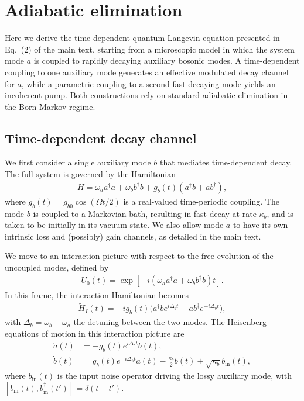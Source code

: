 \documentclass[prl,onecolumn,floatfix,10pt,superscriptaddress]{revtex4-2}
\begin{document}
\section{Adiabatic elimination}
Here we derive the time-dependent quantum Langevin equation presented in Eq.~(2) of the main text, starting from a microscopic model in which the system mode $a$ is coupled to rapidly decaying auxiliary bosonic modes. A time-dependent coupling to one auxiliary mode generates an effective modulated decay channel for $a$, while a parametric coupling to a second fast-decaying mode yields an incoherent pump. Both constructions rely on standard adiabatic elimination in the Born-Markov regime.

\subsection{Time-dependent decay channel}

We first consider a single auxiliary mode $b$ that mediates time-dependent decay. The full system is governed by the Hamiltonian
\begin{align}
H = \omega_a a^\dagger a + \omega_b b^\dagger b +  g_b(t) (a^\dagger b + a b^\dagger),
\end{align}
where $g_b(t) = g_{b0} \cos(\Omega t/2)$ is a real-valued time-periodic coupling. The mode $b$ is coupled to a Markovian bath, resulting in fast decay at rate $\kappa_b$, and is taken to be initially in its vacuum state. We also allow mode $a$ to have its own intrinsic loss and (possibly) gain channels, as detailed in the main text.

We move to an interaction picture with respect to the free evolution of the uncoupled modes, defined by
\begin{align}
U_0(t) = \exp[-i(\omega_a a^\dagger a + \omega_b b^\dagger b)t].
\end{align}
In this frame, the interaction Hamiltonian becomes
\begin{align}
\tilde{H}_I(t) = -i g_b(t) \big(a^\dagger b e^{i \Delta_b t} - a b^\dagger e^{-i \Delta_b t}\big),
\end{align}
with $\Delta_b = \omega_b - \omega_a$ the detuning between the two modes. The Heisenberg equations of motion in this interaction picture are
\begin{align}
\dot{a}(t) &= -g_b(t) e^{i \Delta_b t} b(t), \\
\dot{b}(t) &=  g_b(t) e^{-i \Delta_b t} a(t) - \frac{\kappa_b}{2} b(t) +\sqrt{\kappa_b} b_{\text{in}}(t),
\end{align}
where $b_{\text{in}}(t)$ is the input noise operator driving the lossy auxiliary mode, with
$[b_{\text{in}}(t), b_{\text{in}}^\dagger(t')] = \delta(t - t')$.
\end{document}
